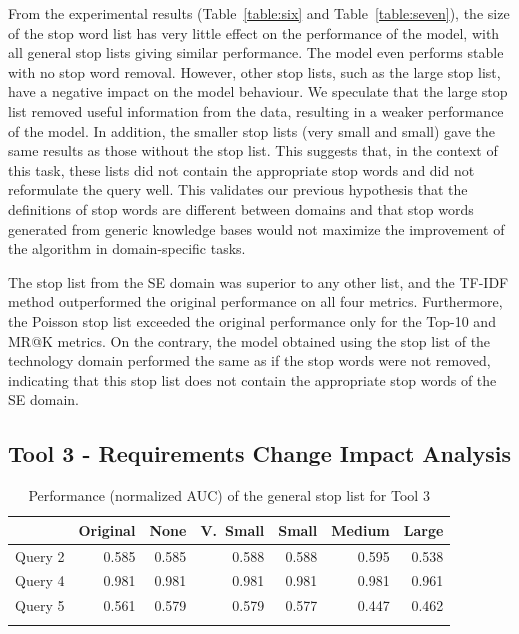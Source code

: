 \documentclass[conference]{IEEEtran}
\begin{document}
\begin{sloppy}
From the experimental results (Table~\ref{table:six} and Table~\ref{table:seven}), the size of the stop word list has very little effect on the performance of the model, with all general stop lists giving similar performance. The model even performs stable with no stop word removal. However, other stop lists, such as the large stop list, have a negative impact on the model behaviour. We speculate that the large stop list removed useful information from the data, resulting in a weaker performance of the model. In addition, the smaller stop lists (very small and small) gave the same results as those without the stop list. This suggests that, in the context of this task, these lists did not contain the appropriate stop words and did not reformulate the query well. This validates our previous hypothesis that the definitions of stop words are different between domains and that stop words generated from generic knowledge bases would not maximize the improvement of the algorithm in domain-specific tasks. 
 
The stop list from the SE domain was superior to any other list, and the TF-IDF method outperformed the original performance on all four metrics. Furthermore, the Poisson stop list exceeded the original performance only for the Top-10 and MR@K metrics. On the contrary, the model obtained using the stop list of the technology domain performed the same as if the stop words were not removed, indicating that this stop list does not contain the appropriate stop words of the SE domain. 

\subsection{Tool 3 - Requirements Change Impact Analysis}

\begin{table}[]
\centering
\caption{Performance (normalized AUC) of the general stop list for Tool 3}
\begin{tabular}{lrrrrrr}
\toprule
        & Original & None & V.~Small & Small & Medium & Large \\
\midrule
Query 2 & 0.585    & 0.585        & \cellcolor{green}0.588      & \cellcolor{green}0.588 & \cellcolor{green}0.595  & \cellcolor{orange}0.538 \\
Query 4 & 0.981    & 0.981        & 0.981      & 0.981 & 0.981  & \cellcolor{orange}0.961 \\
Query 5 & 0.561    & \cellcolor{green}0.579        & \cellcolor{green}0.579      & \cellcolor{green}0.577 & \cellcolor{orange}0.447  & \cellcolor{orange}0.462 \\
\bottomrule
\label{table:eight}
\end{tabular}
\end{table}


\end{sloppy}
\end{document}
